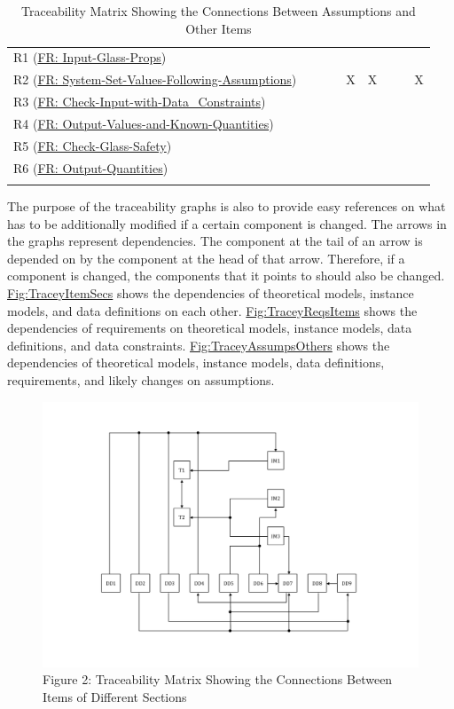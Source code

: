 \documentclass[12pt]{article}
\begin{document}
\begin{longtable}{l l l l l l l l l}
\\
R1 (\hyperref[inputGlassProps]{FR: Input-Glass-Props}) &  &  &  &  &  &  &  & 
\\
R2 (\hyperref[sysSetValsFollowingAssumps]{FR: System-Set-Values-Following-Assumptions}) &  &  &  & X & X &  &  & X
\\
R3 (\hyperref[checkInputWithDataCons]{FR: Check-Input-with-Data\_Constraints}) &  &  &  &  &  &  &  & 
\\
R4 (\hyperref[outputValsAndKnownQuants]{FR: Output-Values-and-Known-Quantities}) &  &  &  &  &  &  &  & 
\\
R5 (\hyperref[checkGlassSafety]{FR: Check-Glass-Safety}) &  &  &  &  &  &  &  & 
\\
R6 (\hyperref[outputQuants]{FR: Output-Quantities}) &  &  &  &  &  &  &  & 
\\
\bottomrule
\caption{Traceability Matrix Showing the Connections Between Assumptions and Other Items}
\label{Table:TraceyAssumpsOthers}
\end{longtable}
The purpose of the traceability graphs is also to provide easy references on what has to be additionally modified if a certain component is changed. The arrows in the graphs represent dependencies. The component at the tail of an arrow is depended on by the component at the head of that arrow. Therefore, if a component is changed, the components that it points to should also be changed. \hyperref[Figure:TraceyItemSecs]{Fig:TraceyItemSecs} shows the dependencies of theoretical models, instance models, and data definitions on each other. \hyperref[Figure:TraceyReqsItems]{Fig:TraceyReqsItems} shows the dependencies of requirements on theoretical models, instance models, data definitions, and data constraints. \hyperref[Figure:TraceyAssumpsOthers]{Fig:TraceyAssumpsOthers} shows the dependencies of theoretical models, instance models, data definitions, requirements, and likely changes on assumptions.
\begin{figure}
\begin{center}
\includegraphics[width=\textwidth]{../../../datafiles/GlassBR/Trace.png}
\caption{Figure 2: Traceability Matrix Showing the Connections Between Items of Different Sections}
\label{Figure:TraceyItemSecs}
\end{center}
\end{figure}
\end{document}
